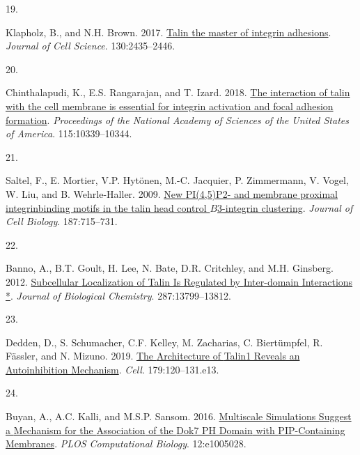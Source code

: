 \documentclass[
  twocolumn]{biophys-new-mod}
\newlength{\cslhangindent}
\newlength{\csllabelwidth}
\newlength{\cslentryspacingunit} %
\newenvironment{CSLReferences}[2] %
 {%
  \setlength{\parindent}{0pt}
  \ifodd #1
  \let\oldpar\par
  \def\par{\hangindent=\cslhangindent\oldpar}
  \fi
  \setlength{\parskip}{#2\cslentryspacingunit}
 }%
 {}
\newcommand{\CSLLeftMargin}[1]{\parbox[t]{\csllabelwidth}{#1}}
\newcommand{\CSLRightInline}[1]{\parbox[t]{\linewidth - \csllabelwidth}{#1}\break}
\begin{document}
\begin{CSLReferences}{0}{0}
\leavevmode{}%
\CSLLeftMargin{19. }%
\CSLRightInline{Klapholz, B., and N.H. Brown. 2017.
\href{https://doi.org/10.1242/jcs.190991}{Talin \textendash{} the master
of integrin adhesions}. \emph{Journal of Cell Science}. 130:2435--2446.}

\leavevmode{}%
\CSLLeftMargin{20. }%
\CSLRightInline{Chinthalapudi, K., E.S. Rangarajan, and T. Izard. 2018.
\href{https://doi.org/10.1073/pnas.1806275115}{The interaction of talin
with the cell membrane is essential for integrin activation and focal
adhesion formation}. \emph{Proceedings of the National Academy of
Sciences of the United States of America}. 115:10339--10344.}

\leavevmode{}%
\CSLLeftMargin{21. }%
\CSLRightInline{Saltel, F., E. Mortier, V.P. Hytönen, M.-C. Jacquier, P.
Zimmermann, V. Vogel, W. Liu, and B. Wehrle-Haller. 2009.
\href{https://doi.org/10.1083/jcb.200908134}{New {PI}(4,5){P2-} and
membrane proximal integrin\textendash binding motifs in the talin head
control {\(B\)}3-integrin clustering}. \emph{Journal of Cell Biology}.
187:715--731.}

\leavevmode{}%
\CSLLeftMargin{22. }%
\CSLRightInline{Banno, A., B.T. Goult, H. Lee, N. Bate, D.R. Critchley,
and M.H. Ginsberg. 2012.
\href{https://doi.org/10.1074/jbc.M112.341214}{Subcellular
{Localization} of {Talin Is Regulated} by {Inter-domain Interactions}
*}. \emph{Journal of Biological Chemistry}. 287:13799--13812.}

\leavevmode{}%
\CSLLeftMargin{23. }%
\CSLRightInline{Dedden, D., S. Schumacher, C.F. Kelley, M. Zacharias, C.
Biertümpfel, R. Fässler, and N. Mizuno. 2019.
\href{https://doi.org/10.1016/j.cell.2019.08.034}{The {Architecture} of
{Talin1 Reveals} an {Autoinhibition Mechanism}}. \emph{Cell}.
179:120--131.e13.}

\leavevmode{}%
\CSLLeftMargin{24. }%
\CSLRightInline{Buyan, A., A.C. Kalli, and M.S.P. Sansom. 2016.
\href{https://doi.org/10.1371/journal.pcbi.1005028}{Multiscale
{Simulations Suggest} a {Mechanism} for the {Association} of the {Dok7
PH Domain} with {PIP-Containing Membranes}}. \emph{PLOS Computational
Biology}. 12:e1005028.}


\end{CSLReferences}
\end{document}
